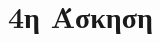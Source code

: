 \documentclass[assignment2.tex]{subfiles}
\begin{document}
\section*{4η Άσκηση}


%
%
%
%
\end{document}

